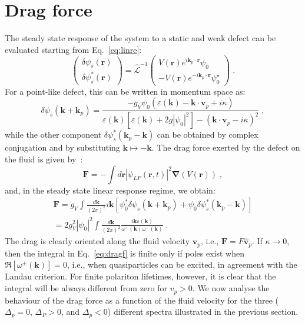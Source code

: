 \section{Drag force}
\label{sec:drag}
%
The steady state response of the system to a static and weak defect
can be evaluated starting from Eq.~\eqref{eq:linre}:
%
\begin{equation*}
  \begin{pmatrix} \delta \psi_s(\bm{r}) \\ \delta
    \psi_s^*(\bm{r}) \end{pmatrix} =
  \hat{\mathcal{L}}^{-1} \begin{pmatrix} V(\bm{r}) e^{i \bm{k}_p
      \cdot \bm{r}} \psi_0 \\ -V(\bm{r}) e^{-i \bm{k}_p \cdot
      \bm{r}} \psi_0^{\star} \end{pmatrix} \; .
\end{equation*}
%
For a point-like defect, this can be written in momentum space as:
%
\begin{equation*}
  \delta \psi_s (\bm{k} + \bm{k}_p) = \frac{-g_V \psi_0
    (\varepsilon(\bm{k}) - \bm{k} \cdot \bm{v}_p +
    i\kappa)}{\varepsilon(\bm{k}) [\varepsilon(\bm{k}) +
      2g|\psi_0|^2] - (\bm{k} \cdot \bm{v}_p - i\kappa)^2} \; ,
\end{equation*}
%
while the other component $\delta \psi_s^* (\bm{k}_p - \bm{k})$
can be obtained by complex conjugation and by substituting $\bm{k}
\mapsto -\bm{k}$. The drag force exerted by the defect on the fluid
is given by~\cite{Astrakharchik_2004}:
%
\begin{equation}
  \bm{F} = - \int d\bm{r} |\psi_{LP}(\bm{r},t)|^2 \bm{\nabla}
  (V(\bm{r})) \; ,
\end{equation}
%
and, in the steady state linear response regime, we obtain:
%
\begin{multline}
  \bm{F} = g_V \int \frac{d\bm{k}}{(2\pi)^2} i\bm{k}
  \left[\psi_0^* \delta\psi_s (\bm{k} + \bm{k}_p) + \psi_0 \delta
    \psi_s^* (\bm{k}_p - \bm{k})\right]\\
%
  = 2g_V^2|\psi_0|^2 \int \frac{d\bm{k}}{(2\pi)^2} \frac{i\bm{k}
    \varepsilon(\bm{k})}{\omega^{+} (\bm{k})\omega^{-} (\bm{k})}
  \; .
    \label{eq:dragf}
\end{multline}
%
The drag is clearly oriented along the fluid velocity $\bm{v}_p$,
i.e., $\bm{F} = F \hat{\bm{v}}_p$. If $\kappa \to 0$, then the
integral in Eq.~\eqref{eq:dragf} is finite only if poles exist when
$\Re [\omega^{\pm} (\bm{k})] = 0$, i.e., when quasiparticles can be
excited, in agreement with the Landau criterion. For finite polariton
lifetimes, however, it is clear that the integral will be always
different from zero for $v_p>0$.
We now analyse the behaviour of the drag force as a function of the
fluid velocity for the three ($\Delta_p = 0$, $\Delta_P > 0$, and
$\Delta_p < 0$) different spectra illustrated in the previous section.

